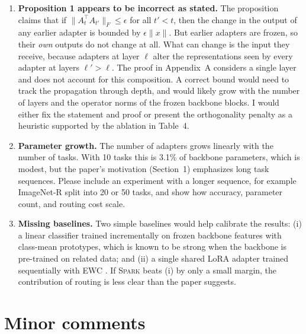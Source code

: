\documentclass[11pt]{article}
\newcommand{\paper}{\textsc{Spark}}
\begin{document}
\begin{enumerate}[label=\textbf{M\arabic*.}]
  \item \textbf{Proposition 1 appears to be incorrect as stated.} The proposition claims that if $\lVert A_t^\top A_{t'} \rVert_F \le \epsilon$ for all $t' < t$, then the change in the output of any earlier adapter is bounded by $\epsilon \lVert x \rVert$. But earlier adapters are frozen, so their \emph{own} outputs do not change at all. What can change is the input they receive, because adapters at layer $\ell$ alter the representations seen by every adapter at layers $\ell' > \ell$. The proof in Appendix~A considers a single layer and does not account for this composition. A correct bound would need to track the propagation through depth, and would likely grow with the number of layers and the operator norms of the frozen backbone blocks. I would either fix the statement and proof or present the orthogonality penalty as a heuristic supported by the ablation in Table~4.

  \item \textbf{Parameter growth.} The number of adapters grows linearly with the number of tasks. With 10 tasks this is 3.1\% of backbone parameters, which is modest, but the paper's motivation (Section~1) emphasizes long task sequences. Please include an experiment with a longer sequence, for example ImageNet-R split into 20 or 50 tasks, and show how accuracy, parameter count, and routing cost scale.

  \item \textbf{Missing baselines.} Two simple baselines would help calibrate the results: (i) a linear classifier trained incrementally on frozen backbone features with class-mean prototypes, which is known to be strong when the backbone is pre-trained on related data; and (ii) a single shared LoRA adapter trained sequentially with EWC \citep{kirkpatrick2017}. If \paper{} beats (i) by only a small margin, the contribution of routing is less clear than the paper suggests.

\end{enumerate}

\section{Minor comments}
\end{document}
